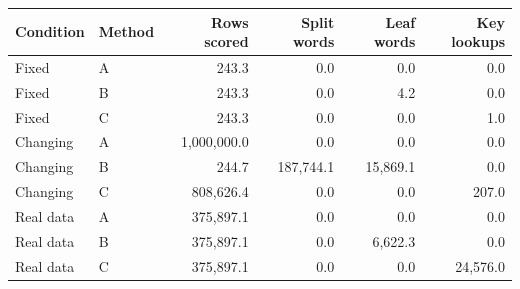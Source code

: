 \begin{tabular}{@{}llrrrr@{}}
\toprule
Condition & Method & Rows scored & Split words & Leaf words & Key lookups \\
\midrule
Fixed & A & 243.3 & 0.0 & 0.0 & 0.0 \\
Fixed & B & 243.3 & 0.0 & 4.2 & 0.0 \\
Fixed & C & 243.3 & 0.0 & 0.0 & 1.0 \\
Changing & A & 1,000,000.0 & 0.0 & 0.0 & 0.0 \\
Changing & B & 244.7 & 187,744.1 & 15,869.1 & 0.0 \\
Changing & C & 808,626.4 & 0.0 & 0.0 & 207.0 \\
Real data & A & 375,897.1 & 0.0 & 0.0 & 0.0 \\
Real data & B & 375,897.1 & 0.0 & 6,622.3 & 0.0 \\
Real data & C & 375,897.1 & 0.0 & 0.0 & 24,576.0 \\
\bottomrule
\end{tabular}
